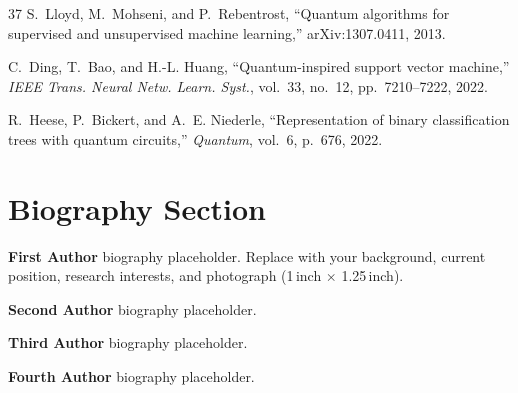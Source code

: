 \documentclass[journal]{IEEEtran}
\begin{document}
\begin{thebibliography}{37}
  S.~Lloyd, M.~Mohseni, and P.~Rebentrost, ``Quantum algorithms for
    supervised and unsupervised machine learning,''
  arXiv:1307.0411, 2013.

  C.~Ding, T.~Bao, and H.-L. Huang, ``Quantum-inspired support
    vector machine,'' \emph{IEEE Trans. Neural Netw. Learn. Syst.},
    vol.~33, no.~12, pp.~7210--7222, 2022.

  R.~Heese, P.~Bickert, and A.~E. Niederle, ``Representation of
    binary classification trees with quantum circuits,''
  \emph{Quantum}, vol.~6, p.~676, 2022.

  \end{thebibliography}

  \section*{Biography Section}
  \vspace{-2\baselineskip}

  \noindent\textbf{First Author} biography placeholder. Replace with
  your background, current position, research interests, and
  photograph (1\,inch $\times$ 1.25\,inch).

  \vspace{1ex}
  \noindent\textbf{Second Author} biography placeholder.

  \vspace{1ex}
  \noindent\textbf{Third Author} biography placeholder.

  \vspace{1ex}
  \noindent\textbf{Fourth Author} biography placeholder.

  
\end{document}

